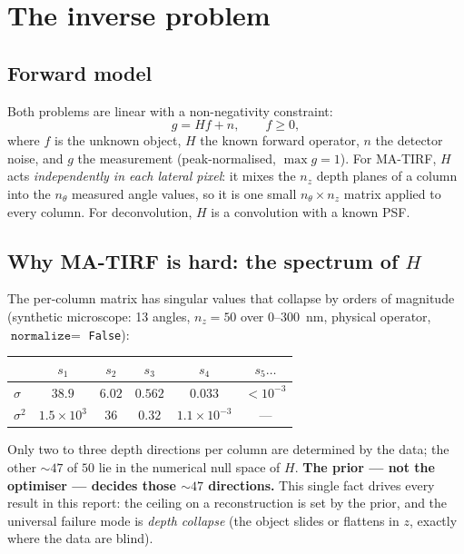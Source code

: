 \section{The inverse problem}
\label{sec:problem}

\subsection{Forward model}
Both problems are linear with a non-negativity constraint:
\begin{equation}
g = H f + n, \qquad f \ge 0,
\end{equation}
where $f$ is the unknown object, $H$ the known forward operator, $n$ the detector noise, and $g$
the measurement (peak-normalised, $\max g = 1$). For MA-TIRF, $H$ acts \emph{independently in
each lateral pixel}: it mixes the $n_z$ depth planes of a column into the $n_\theta$ measured
angle values, so it is one small $n_\theta \times n_z$ matrix applied to every column. For
deconvolution, $H$ is a convolution with a known PSF.

\subsection{Why MA-TIRF is hard: the spectrum of $H$}
The per-column matrix has singular values that collapse by orders of magnitude (synthetic
microscope: 13 angles, $n_z = 50$ over $0$--$300$~nm, physical operator, $\texttt{normalize}=$
\texttt{False}):
\begin{center}
\begin{tabular}{lccccc}
\toprule
 & $s_1$ & $s_2$ & $s_3$ & $s_4$ & $s_5\ldots$ \\
\midrule
$\sigma$   & $38.9$ & $6.02$ & $0.562$ & $0.033$ & $<10^{-3}$ \\
$\sigma^2$ & $1.5\times10^{3}$ & $36$ & $0.32$ & $1.1\times10^{-3}$ & --- \\
\bottomrule
\end{tabular}
\end{center}
Only two to three depth directions per column are determined by the data; the other ${\sim}47$
of $50$ lie in the numerical null space of $H$. \textbf{The prior --- not the optimiser ---
decides those ${\sim}47$ directions.} This single fact drives every result in this report: the
ceiling on a reconstruction is set by the prior, and the universal failure mode is
\emph{depth collapse} (the object slides or flattens in $z$, exactly where the data are blind).


